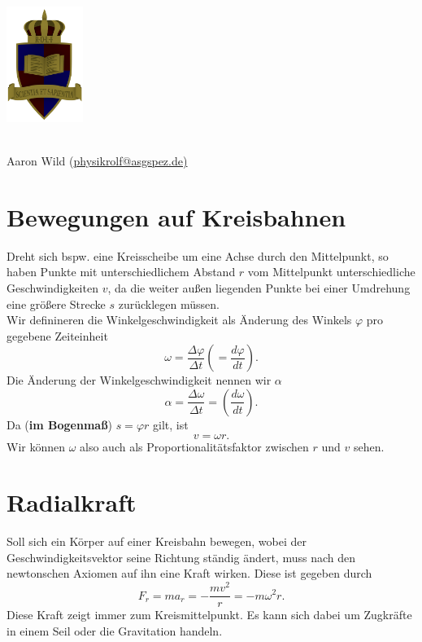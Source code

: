 \documentclass[a4paper,8pt]{extarticle}
\theoremstyle{problemstyle}
\begin{document}

\begin{multicols}{2}
\parbox{2.5cm}{\includegraphics[width=2.5cm]{../task/images/ROLF4.png}}
\parbox{4.5cm}{\\Aaron Wild (\href{mailto:physikrolf@asgspez.de}{physikrolf@asgspez.de)}}
\section*{Bewegungen auf Kreisbahnen}
Dreht sich bspw. eine Kreisscheibe um eine Achse durch den Mittelpunkt, so haben Punkte mit unterschiedlichem Abstand $r$ vom Mittelpunkt unterschiedliche Geschwindigkeiten $v$, da die weiter außen liegenden Punkte bei einer Umdrehung eine größere Strecke $s$ zurücklegen müssen.\\
Wir definineren die Winkelgeschwindigkeit als Änderung des Winkels $\varphi$ pro gegebene Zeiteinheit
\begin{equation}
\label{omegadef}
    \omega = \frac{\Delta \varphi}{\Delta t}\left( = \frac{d\varphi}{dt}\right).
\end{equation}
Die Änderung der Winkelgeschwindigkeit nennen wir $\alpha$ 
\begin{equation}
    \label{alphadef}
    \alpha = \frac{\Delta \omega}{\Delta t}= \left(\frac{d\omega}{dt}\right).
\end{equation}
Da (\textbf{im Bogenmaß}) $s = \varphi r$ gilt, ist 
\begin{equation}
\label{vdef}
    v = \omega r.
\end{equation}
Wir können $\omega$ also auch als Proportionalitätsfaktor zwischen $r$ und $v$ sehen.

\section*{Radialkraft}

Soll sich ein Körper auf einer Kreisbahn bewegen, wobei der Geschwindigkeitsvektor seine Richtung ständig ändert, muss nach den newtonschen Axiomen auf ihn eine Kraft wirken. Diese ist gegeben durch
\begin{equation}
\label{fr}
F_r = m a_r = -\frac{mv^2}{r} = - m\omega^2 r.
\end{equation}
Diese Kraft zeigt immer zum Kreismittelpunkt. Es kann sich dabei um Zugkräfte in einem Seil oder die Gravitation handeln.

\end{multicols}
\end{document}
